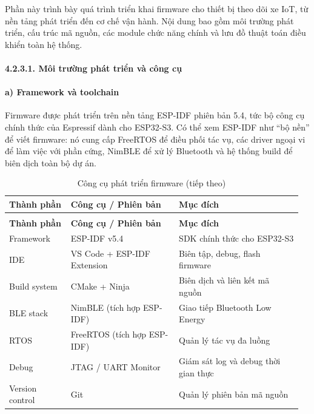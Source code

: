 \documentclass[a4paper]{extarticle}
\newcommand{\thesissettableid}[2]{%
  \renewcommand{\thetable}{#1}%
  \renewcommand{\theHtable}{#2}%
}
\begin{document}
Phần này trình bày quá trình triển khai firmware cho thiết bị theo dõi
xe IoT, từ nền tảng phát triển đến cơ chế vận hành. Nội dung bao gồm môi
trường phát triển, cấu trúc mã nguồn, các module chức năng chính và lưu
đồ thuật toán điều khiển toàn hệ thống.

\paragraph{4.2.3.1. Môi trường phát triển và công
cụ}\label{4231-muxf4i-trux1b0ux1eddng-phuxe1t-triux1ec3n-vuxe0-cuxf4ng-cux1ee5}

\paragraph{a) Framework và toolchain}\label{a-framework-vuxe0-toolchain}

Firmware được phát triển trên nền tảng ESP-IDF phiên bản 5.4, tức bộ
công cụ chính thức của Espressif dành cho ESP32-S3. Có thể xem ESP-IDF
như ``bộ nền'' để viết firmware: nó cung cấp FreeRTOS để điều phối tác
vụ, các driver ngoại vi để làm việc với phần cứng, NimBLE để xử lý
Bluetooth và hệ thống build để biên dịch toàn bộ dự án.


{\thesissettableid{4.5}{tab-ch4-cong-cu-phat-trien-firmware}
\def\LTcaptype{table}
\begin{longtable}{|L{0.208\linewidth}|L{0.355\linewidth}|L{0.401\linewidth}|}
\caption{Công cụ phát triển firmware}\label{tab:ch4-cong-cu-phat-trien-firmware}\\
\hline \textbf{Thành phần} & \textbf{Công cụ / Phiên bản} & \textbf{Mục đích} \\
\hline
\endfirsthead
\caption[]{Công cụ phát triển firmware (tiếp theo)}\\
\hline \textbf{Thành phần} & \textbf{Công cụ / Phiên bản} & \textbf{Mục đích} \\
\hline
\endhead
\hline
\endfoot
\endlastfoot
Framework & ESP-IDF v5.4 & SDK chính thức cho ESP32-S3 \\\hline
IDE & VS Code + ESP-IDF Extension & Biên tập, debug, flash firmware \\\hline
Build system & CMake + Ninja & Biên dịch và liên kết mã nguồn \\\hline
BLE stack & NimBLE (tích hợp ESP-IDF) & Giao tiếp Bluetooth Low
Energy \\\hline
RTOS & FreeRTOS (tích hợp ESP-IDF) & Quản lý tác vụ đa luồng \\\hline
Debug & JTAG / UART Monitor & Giám sát log và debug thời gian thực \\\hline
Version control & Git & Quản lý phiên bản mã nguồn \\\hline
\end{longtable}
}
\end{document}
